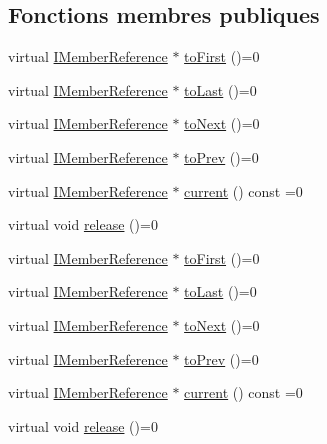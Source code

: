 \subsection*{Fonctions membres publiques}
\begin{DoxyCompactItemize}
\item 
virtual \hyperlink{class_i_member_reference}{I\+Member\+Reference} $\ast$ \hyperlink{class_i_member_reference_iterator_a45b195355d4eec11428ebec00c8f68b9}{to\+First} ()=0
\item 
virtual \hyperlink{class_i_member_reference}{I\+Member\+Reference} $\ast$ \hyperlink{class_i_member_reference_iterator_a4eff5275fd66746233dc442dda2080a1}{to\+Last} ()=0
\item 
virtual \hyperlink{class_i_member_reference}{I\+Member\+Reference} $\ast$ \hyperlink{class_i_member_reference_iterator_a45d2a1cddd36ba3231b9052b46612ce2}{to\+Next} ()=0
\item 
virtual \hyperlink{class_i_member_reference}{I\+Member\+Reference} $\ast$ \hyperlink{class_i_member_reference_iterator_ae1aee254fc598d0f5b380c6b00d6cea6}{to\+Prev} ()=0
\item 
virtual \hyperlink{class_i_member_reference}{I\+Member\+Reference} $\ast$ \hyperlink{class_i_member_reference_iterator_adacd92a7a301626480737f27f5374dfb}{current} () const  =0
\item 
virtual void \hyperlink{class_i_member_reference_iterator_a3d231c536f882fdc4d7957612a09a278}{release} ()=0
\item 
virtual \hyperlink{class_i_member_reference}{I\+Member\+Reference} $\ast$ \hyperlink{class_i_member_reference_iterator_a45b195355d4eec11428ebec00c8f68b9}{to\+First} ()=0
\item 
virtual \hyperlink{class_i_member_reference}{I\+Member\+Reference} $\ast$ \hyperlink{class_i_member_reference_iterator_a4eff5275fd66746233dc442dda2080a1}{to\+Last} ()=0
\item 
virtual \hyperlink{class_i_member_reference}{I\+Member\+Reference} $\ast$ \hyperlink{class_i_member_reference_iterator_a45d2a1cddd36ba3231b9052b46612ce2}{to\+Next} ()=0
\item 
virtual \hyperlink{class_i_member_reference}{I\+Member\+Reference} $\ast$ \hyperlink{class_i_member_reference_iterator_ae1aee254fc598d0f5b380c6b00d6cea6}{to\+Prev} ()=0
\item 
virtual \hyperlink{class_i_member_reference}{I\+Member\+Reference} $\ast$ \hyperlink{class_i_member_reference_iterator_adacd92a7a301626480737f27f5374dfb}{current} () const  =0
\item 
virtual void \hyperlink{class_i_member_reference_iterator_a3d231c536f882fdc4d7957612a09a278}{release} ()=0
\end{DoxyCompactItemize}


